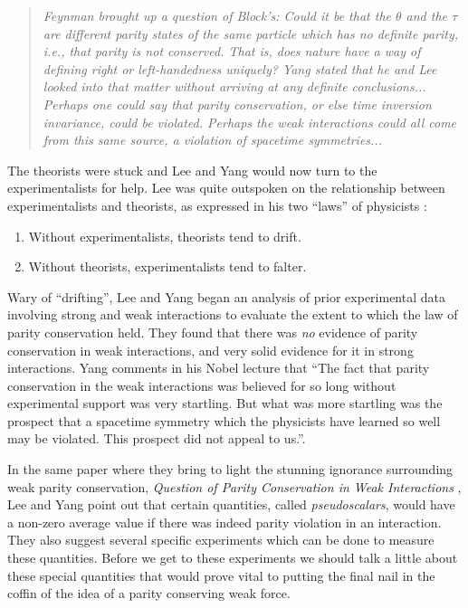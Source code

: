\documentclass[a4paper,12pt]{book}
\begin{document}
\begin{quote}
\textit{ Feynman brought up a question of Block's: Could it be that the $\theta$ and the $\tau$ are different parity states of the same particle which has no definite parity, i.e., that parity is not conserved. That is, does nature have a way of defining right or left-handedness uniquely? Yang stated that he and Lee looked into that matter without arriving at any definite conclusions... Perhaps one could say that parity conservation, or else time inversion invariance, could be violated. Perhaps the weak interactions could all come from this same source, a violation of spacetime symmetries...}
\end{quote}

The theorists were stuck and Lee and Yang would now turn to the experimentalists for help. Lee was quite outspoken on the relationship between experimentalists and theorists, as expressed in his two ``laws'' of physicists \cite{lee2}:

\begin{enumerate}
 \item Without experimentalists, theorists tend to drift.
 \item Without theorists, experimentalists tend to falter.
\end{enumerate}

Wary of ``drifting'', Lee and Yang began an analysis of prior experimental data involving strong and weak interactions to evaluate the extent to which the law of parity conservation held. They found that there was \emph{no} evidence of parity conservation in weak interactions, and very solid evidence for it in strong interactions. Yang comments in his Nobel lecture that ``The fact that parity conservation in the weak interactions was believed for so long without experimental support was very startling. But what was more startling was the prospect that a spacetime symmetry which the physicists have learned so well may be violated. This prospect did not appeal to us.''\cite{yang}.

In the same paper where they bring to light the stunning ignorance surrounding weak parity conservation, \emph{Question of Parity Conservation in Weak Interactions} \cite{lee&yang}, Lee and Yang point out that certain quantities, called \emph{pseudoscalars}, would have a non-zero average value if there was indeed parity violation in an interaction. They also suggest several specific experiments which can be done to measure these quantities. Before we get to these experiments we should talk a little about these special quantities that would prove vital to putting the final nail in the coffin of the idea of a parity conserving weak force.
\end{document}
